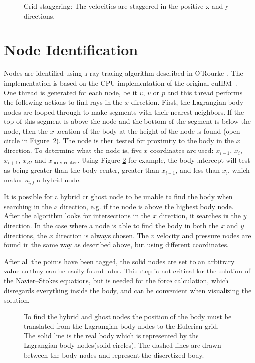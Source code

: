\begin{figure}[!htb]
	\centering
	
	\caption{Grid staggering: The velocities are staggered in the positive x and y directions.}
	\label{fig:stagger}
\end{figure}

\section{Node Identification}
Nodes are identified using a ray-tracing algorithm described in O'Rourke~\cite{o1998computational}.
The implementation is based on the CPU implementation of the original cuIBM~\cite{krishnan2012validation}. 
One thread is generated for each node, be it $u$, $v$ or $p$ and this thread performs the following actions to find rays in the $x$ direction. 
First, the Lagrangian body nodes are looped through to make segments with their nearest neighbors. 
If the top of this segment is above the node and the bottom of the segment is below the node, then the $x$ location of the body at the height of the node is found (open circle in Figure~\ref{fig:node id 1}).
The node is then tested for proximity to the body in the $x$ direction. 
To determine what the node is, five $x$-coordinates are used: $x_{i-1}$, $x_{i}$, $x_{i+1}$, $x_{BI}$ and $x_{\text{body center}}$. 
Using Figure \ref{fig:node id 1} for example, the body intercept will test as being greater than the body center, greater than $x_{i-1}$, and less than $x_{i}$, which makes $u_{i,j}$ a hybrid node. 

It is possible for a hybrid or ghost node to be unable to find the body when searching in the $x$ direction, e.g. if the node is above the highest body node. 
After the algorithm looks for intersections in the $x$ direction, it searches in the $y$ direction. 
In the case where a node is able to find the body in both the $x$ and $y$ directions, the $x$ direction is always chosen. 
The $v$ velocity and pressure nodes are found in the same way as described above, but using different coordinates. 

After all the points have been tagged, the solid nodes are set to an arbitrary value so they can be easily found later.
This step is not critical for the solution of the Navier--Stokes equations, but is needed for the force calculation, which disregards everything inside the body, and can be convenient when visualizing the solution. 
\begin{figure}
	\centering
	
	\caption{To find the hybrid and ghost nodes the position of the body must be translated from the Lagrangian body nodes to the Eulerian grid. The solid line is the real body which is represented by the Lagrangian body nodes(solid circles). The dashed lines are drawn between the body nodes and represent the discretized body.}
	\label{fig:node id 1}
\end{figure}

